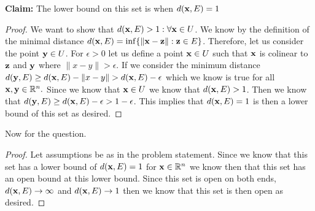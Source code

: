 \documentclass[11pt]{article}
\theoremstyle{definition}
\newcommand{\R}{\mathbb{R}}
\begin{document}
\textbf{Claim: } The lower bound on this set is when $d({\bf x}, E) = 1$
\begin{proof}
We want to show that $d({\bf x}, E) > 1: \forall {\bf x}\in U$. We know by the definition of the minimal distance $d({\bf x}, E) = \inf\{\|{\bf x} - {\bf z}\|: {\bf z}\in E\}$. Therefore, let us consider the point ${\bf y} \in U$. For $\epsilon > 0$ let us define a point ${\bf x} \in U$ such that ${\bf x}$ is colinear to ${\bf z}$ and ${\bf y}$ where $\|x-y\| > \epsilon$. If we consider the minimum distance $d({\bf y}, E)\geq d({\bf x}, E) - \|x-y\| > d({\bf x}, E) - \epsilon$ which we know is true for all ${\bf x}, {\bf y}\in \R^n.$ Since we know that ${\bf x}\in U$ we know that $d({\bf x}, E) > 1$. Then we know that $d({\bf y}, E) \geq d({\bf x}, E) - \epsilon > 1 - \epsilon$. This implies that $d({\bf x}, E) = 1$ is then a lower bound of this set as desired.
\end{proof}
Now for the question.
\begin{proof}
Let assumptions be as in the problem statement. Since we know that this set has a lower bound of $d({\bf x}, E) = 1$ for ${\bf x}\in \R^n$ we know then that this set has an open bound at this lower bound. Since this set is open on both ends, $d({\bf x}, E) \to \infty$ and $d({\bf x}, E) \to 1$ then we know that this set is then open as desired.
\end{proof}
\end{document}
